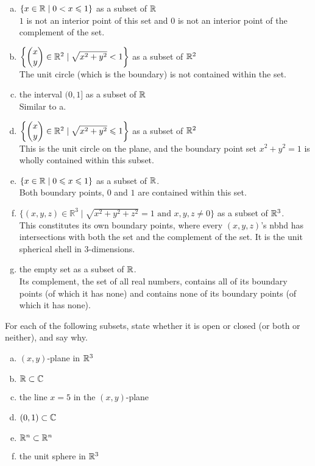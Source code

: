\begin{enumerate}[a.]
	\item $\left\{ x\in \mathbb{R} \mid 0<x \leqslant 1 \right\}$ as a subset of $\mathbb{R}$ \\
	 $1$ is not an interior point of this set and $0$ is not an interior point of the complement of the set.
	\item $\left\{ \begin{pmatrix} x \\ y \end{pmatrix}\in \mathbb{R}^2 \mid \sqrt{x^2+y^2}< 1 \right\}$ as a subset of $\mathbb{R}^2$ \\
	 The unit circle (which is the boundary) is not contained within the set.
	\item the interval $(0,1]$ as a subset of $\mathbb{R}$ \\
	 Similar to a.
	\item $\left\{ \begin{pmatrix} x \\ y \end{pmatrix}\in \mathbb{R}^2 \mid \sqrt{x^2+y^2}\leqslant 1 \right\}$ as a subset of $\mathbb{R}^2$ \\
	 This is the unit circle on the plane, and the boundary point set $x^2+y^2=1$ is wholly contained within this subset. 
	
	\item $\{x\in\mathbb{R}\mid 0\leqslant x\leqslant 1\}$ as a subset of $\mathbb{R}$. \\
	 Both boundary points, $0$ and $1$ are contained within this set. 
	
	\item $\{(x,y,z)\in\mathbb R^3 \mid \sqrt{x^2+y^2+z^2}=1 \text{ and }x,y,z\neq 0\}$ as a subset of $\mathbb{R}^3$. \\
	 This constitutes its own boundary points, where every $(x,y,z)$'s nbhd has intersections with both the set and the complement of the set. It is the unit spherical shell in 3-dimensions. 
	
	\item the empty set as a subset of $\mathbb{R}$. \\
	 Its complement, the set of all real numbers, contains all of its boundary points (of which it has none) and contains none of its boundary points (of which it has none). 
\end{enumerate}


For each of the following subsets, state whether it is open or closed (or both or neither), and say why.
\begin{enumerate}[a.]
\item $(x,y)$-plane in $\mathbb{R}^3$
\item $\mathbb{R}\subset \mathbb{C}$
\item the line $x=5$ in the $(x,y)$-plane
\item $(0,1)\subset \mathbb{C}$
\item $\mathbb{R}^n\subset \mathbb{R}^n$
\item the unit sphere in $\mathbb{R}^3$
\end{enumerate}

